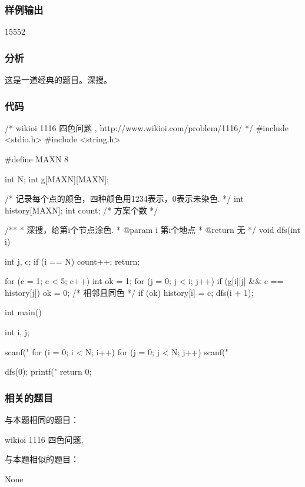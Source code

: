 \subsubsection{样例输出}
\begin{Code}
15552
\end{Code}

\subsubsection{分析}
这是一道经典的题目。深搜。

\subsubsection{代码}
\begin{Codex}[label=four_colors.c]
/* wikioi 1116 四色问题   , http://www.wikioi.com/problem/1116/ */
#include <stdio.h>
#include <string.h>

#define MAXN 8

int N;
int g[MAXN][MAXN];

/* 记录每个点的颜色，四种颜色用1234表示，0表示未染色. */
int history[MAXN];
int count; /* 方案个数 */

/**
 * 深搜，给第i个节点涂色.
 * @param i 第i个地点
 * @return 无
 */
void dfs(int i) {
    int j, c;
    if (i == N) {
        count++;
        return;
    }

    for (c = 1; c < 5; c++) {
        int ok = 1;
        for (j = 0; j < i; j++) {
            if (g[i][j] && c == history[j])
                ok = 0; /* 相邻且同色 */
        }
        if (ok) {
            history[i] = c;
            dfs(i + 1);
        }
    }
}

int main() {
    int i, j;

    scanf("%
    for (i = 0; i < N; i++) {
        for (j = 0; j < N; j++) {
            scanf("%
        }
    }

    dfs(0);
    printf("%
    return 0;
}
\end{Codex}

\subsubsection{相关的题目}
与本题相同的题目：
\begindot
\item wikioi 1116 四色问题, 
\myenddot

与本题相似的题目：
\begindot
\item None
\myenddot


